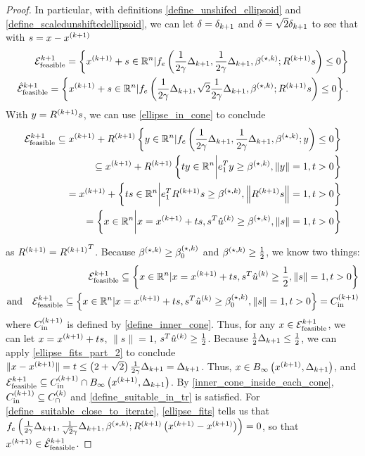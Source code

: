 \begin{proof}
In particular, with definitions \cref{define_unshifed_ellipsoid} and \cref{define_scaledunshiftedellipsoid},
we can let $\delta = {\delta_{k+1}}$ and $\delta = \sqrt{2}{\delta_{k+1}}$ to see that with $s = x - {{x}^{(k+1)}}$
\begin{align*}
{\mathcal E^{k+1}_{\textrm{feasible}}} = \left\{{{x}^{(k+1)}} + s \in \mathbb R^n | f_e\left(\frac 1 {2\gamma} \Delta_{k+1}, \frac 1 {2\gamma} \Delta_{k+1}, {\beta^{(\star, k)}}; {R^{(k+1)}} s \right) \le 0 \right\} \\
{{\mathcal {\hat E}_{\text{feasible}}}^{k+1}} = \left\{{{x}^{(k+1)}} + s \in \mathbb R^n | f_e\left(\frac 1 {2\gamma} \Delta_{k+1}, \sqrt{2} \frac {1}{2\gamma}\Delta_{k+1}, {\beta^{(\star, k)}}; {R^{(k+1)}} s\right) \le 0 \right\}.
\end{align*}
With $y = {R^{(k+1)}} s$,  we can use \cref{ellipse_in_cone} to conclude
\begin{align*}
{\mathcal E^{k+1}_{\textrm{feasible}}}
\subseteq {{x}^{(k+1)}} + {R^{(k+1)}}\left\{y \in \mathbb R^n | f_e\left(\frac 1 {2\gamma} \Delta_{k+1}, \frac 1 {2\gamma} \Delta_{k+1}, {\beta^{(\star, k)}}; y \right) \le 0 \right\} \\
\subseteq  {{x}^{(k+1)}} + {R^{(k+1)}} \left\{t y \in \mathbb R^n \bigg| e_1^Ty \ge {\beta^{(\star, k)}}, \left\|y\right\| = 1, t > 0 \right\} \\
= {{x}^{(k+1)}} + \left\{t s \in \mathbb R^n \bigg| e_1^T{R^{(k+1)}} s \ge {\beta^{(\star, k)}}, \left\|{R^{(k+1)}} s\right\| = 1, t > 0 \right\} \\
= \left\{x  \in \mathbb R^n \bigg| x = {{x}^{(k+1)}} + ts, s^T{{\hat u}^{(k)}} \ge {\beta^{(\star, k)}}, \|s\| = 1, t > 0 \right\}
\end{align*}

as ${R^{(k+1)}} = {R^{(k+1)}}^T$.
Because ${\beta^{(\star, k)}} \ge {\beta_0^{(\star, k)}}$ and ${\beta^{(\star, k)}} \ge \frac 1 2$, we know two things:
\begin{align*}
{\mathcal E^{k+1}_{\textrm{feasible}}} \subseteq \left\{x \in \mathbb R^n | x = {{x}^{(k+1)}} + ts, s^T{{\hat u}^{(k)}} \ge \frac 1 2, \|s\|= 1, t > 0 \right\} \\
\textrm{and} \quad {\mathcal E^{k+1}_{\textrm{feasible}}} \subseteq \left\{x \in \mathbb R^n | x = {{x}^{(k+1)}} + ts, s^T{{\hat u}^{(k)}} \ge {\beta_0^{(\star, k)}}, \|s\|= 1, t > 0 \right\} = {C^{(k+1)}_{\textrm{in}}}
\end{align*}
where ${C^{(k+1)}_{\textrm{in}}}$ is defined by \cref{define_inner_cone}.
Thus, for any $x \in {\mathcal E^{k+1}_{\textrm{feasible}}}$, we can let $x = {{x}^{(k+1)}} + ts$, $\|s\| = 1$, $s^T{{\hat u}^{(k)}} \ge \frac 1 2$.
Because $\frac 1 2 \Delta_{k+1} \le \frac 1 2$, we can apply \cref{ellipse_fits_part_2} to conclude $\|x - {{x}^{(k+1)}}\| = t \le \left(2 + \sqrt{2}\right)\frac 1 {2\gamma} \Delta_{k+1} = \Delta_{k+1}$.
Thus, $x \in { B_{\infty}\left({{x}^{(k+1)}}, \Delta_{k+1}\right) }$, and ${\mathcal E^{k+1}_{\textrm{feasible}}} \subseteq {C^{(k+1)}_{\textrm{in}}} \cap { B_{\infty}\left({{x}^{(k+1)}}, \Delta_{k+1}\right) }$.
By \cref{inner_cone_inside_each_cone}, ${C^{(k+1)}_{\textrm{in}}} \subseteq {C^{(k)}_{\cap}}$ and \cref{define_suitable_in_tr} is satisfied.
For \cref{define_suitable_close_to_iterate}, \cref{ellipse_fits} tells us that
$f_e\left(\frac 1 {2\gamma} \Delta_{k+1}, \frac 1 {\sqrt{2}\gamma}\Delta_{k+1}, {\beta^{(\star, k)}}; {R^{(k+1)}}\left({{x}^{(k+1)}} - {{x}^{(k+1)}}\right)\right) = 0$, so that ${{x}^{(k+1)}} \in {{\mathcal {\hat E}_{\text{feasible}}}^{k+1}}$.
\end{proof}



